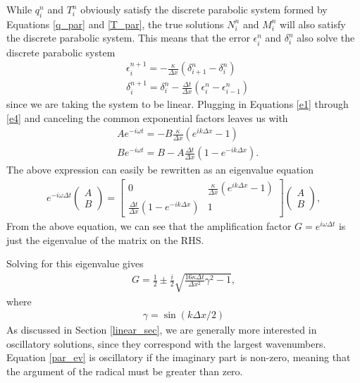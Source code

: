 \documentclass[iop]{emulateapj}
\begin{document}
				While $q_i^n$ and $T_i^n$ obviously satisfy the discrete parabolic system formed by Equations \ref{q_par} and \ref{T_par}, the true solutions $N_i^n$ and $M_i^n$ will also satisfy the discrete parabolic system. This means that the error $\epsilon_i^n$ and $\delta_i^n$ also solve the discrete parabolic system 
				\begin{align}
					& \epsilon_i^{n+1} = - \frac{\kappa}{\Delta x} \left( \delta_{i+1}^n - \delta_{i}^n \right) \\
					& \delta_i^{n+1} = \delta_i^n - \frac{\Delta t}{\Delta x} \left( \epsilon_i^n - \epsilon_{i-1}^n \right)
				\end{align}
				since we are taking the system to be linear. Plugging in Equations \ref{e1} through \ref{e4} and canceling the common exponential factors leaves us with
				\begin{align}
					& A e^{-i \omega t} = - B \frac{\kappa}{\Delta x} \left( e^{i k \Delta x} - 1 \right) \\
					& B e^{-i \omega t} = B - A \frac{\Delta t}{\Delta x} \left( 1 - e^{-i k \Delta x} \right).
				\end{align}
				The above expression can easily be rewritten as an eigenvalue equation
				\begin{align}
					e^{-i \omega \Delta t} \begin{pmatrix}
					A \\
					B
					\end{pmatrix} = \begin{bmatrix}
						0 & \frac{\kappa}{\Delta x} \left( e^{i k \Delta x} - 1 \right) \\
						\frac{\Delta t}{\Delta x} \left( 1 - e^{-i k \Delta x} \right) & 1
					\end{bmatrix}
					\begin{pmatrix}
					A \\
					B
					\end{pmatrix}, \label{par_mat}
				\end{align}
				From the above equation, we can see that the amplification factor $G = e^{i \omega \Delta t}$ is just the eigenvalue of the matrix on the \ac{RHS}.
				
				Solving for this eigenvalue gives
				\begin{align}
				G = \frac{1}{2} \pm \frac{i}{2} \sqrt{\frac{16 \kappa \Delta t}{\Delta x^2} \gamma^2  - 1}, \label{par_ev}
				\end{align}
				where
				\begin{align}
					\gamma = \sin(k \Delta x / 2)
				\end{align}
				As discussed in Section \ref{linear_sec}, we are generally more interested in oscillatory solutions, since they correspond with the largest wavenumbers.
				Equation \ref{par_ev} is oscillatory if the imaginary part is non-zero, meaning that the argument of the radical must be greater than zero.
\end{document}
